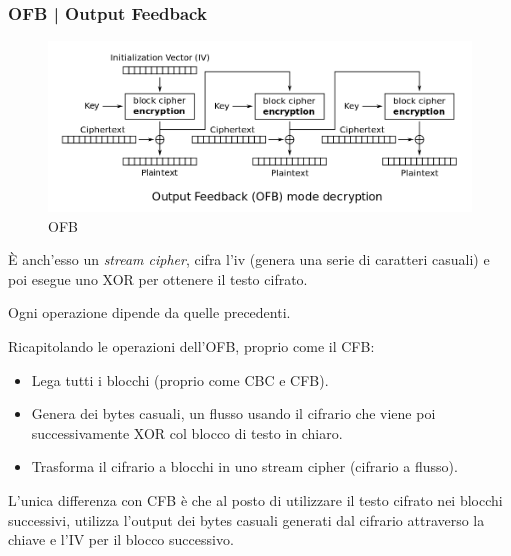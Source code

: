 
\subsubsection{OFB | Output Feedback}


\begin{figure}[H]
	\centering
	\includegraphics[width=1\textwidth, height=1\textheight, keepaspectratio]{./images/aes_modes/ofb.png} %
	\caption{OFB}
	\label{fig:ofb}
\end{figure}

  

\textsf{\small È anch'esso un \emph{stream cipher}, cifra l'iv (genera una serie di caratteri casuali)  e poi esegue uno XOR per ottenere il testo cifrato.}

\textsf{\small Ogni operazione dipende da quelle precedenti.}

 

\textsf{\small Ricapitolando le operazioni dell'OFB, proprio come il CFB:}

    

\begin{itemize}
	\item \textsf{\small Lega tutti i blocchi (proprio come CBC e CFB).}
	\item \textsf{\small Genera dei bytes casuali, un flusso usando il cifrario che viene poi successivamente XOR col blocco di testo in chiaro.}
	\item \textsf{\small Trasforma il cifrario a blocchi in uno stream cipher (cifrario a flusso).}
\end{itemize}

 

\textsf{\small L'unica differenza con CFB è che al posto di utilizzare il testo cifrato nei blocchi successivi, utilizza l'output dei bytes casuali generati dal cifrario attraverso la chiave e l'IV per il blocco successivo.}

